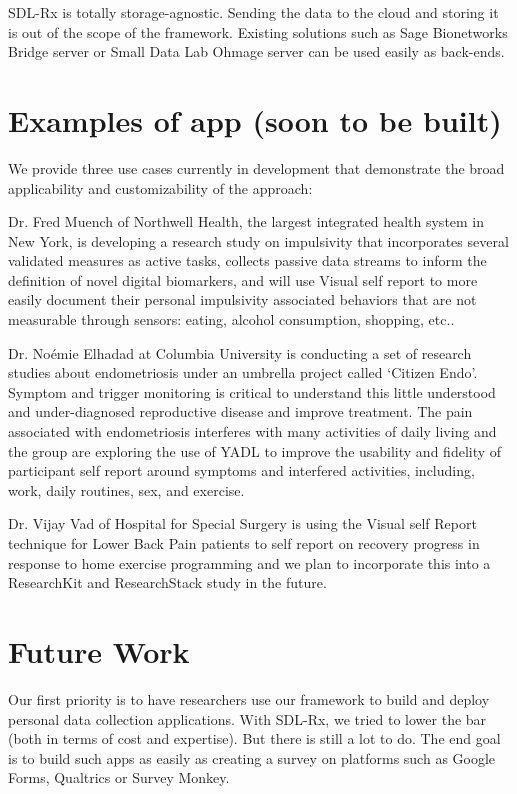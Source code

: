 \documentclass{acm_proc_article-sp}
\begin{document}
SDL-Rx is totally storage-agnostic. Sending the data to the cloud and storing it is out of the scope of the framework. Existing solutions such as Sage Bionetworks Bridge server \cite{noauthor_undated-ax} or Small Data Lab Ohmage server \cite{Software_undated-mu} can be used easily as back-ends.

\section{Examples of app (soon to be built)}
We provide three use cases currently in development that demonstrate the broad applicability and customizability of the approach:

Dr. Fred Muench of Northwell Health, the largest integrated health system in New York, is developing a research study on impulsivity that incorporates several validated measures as active tasks, collects passive data streams to inform the definition of novel digital biomarkers, and will use Visual self report to more easily document their personal impulsivity associated behaviors that are not measurable through sensors: eating, alcohol consumption, shopping, etc..

Dr. No\'{e}mie Elhadad at Columbia University is conducting a set of research studies about endometriosis under an umbrella project called `Citizen Endo'. Symptom and trigger monitoring is critical to understand this little understood and under-diagnosed reproductive disease and improve treatment. The pain associated with endometriosis interferes with many activities of daily living and the group are exploring the use of YADL to improve the usability and fidelity of participant self report around symptoms and interfered activities, including, work, daily routines, sex, and exercise.

Dr. Vijay Vad of Hospital for Special Surgery  is using the Visual self Report technique for Lower Back Pain patients to self report on recovery progress in response to home exercise programming and we plan to incorporate this into a ResearchKit and ResearchStack study in the future.



\section{Future Work}
Our first priority is to have researchers use our framework to build and deploy personal data collection applications. With SDL-Rx, we tried to lower the bar (both in terms of cost and expertise). But there is still a lot to do. The end goal is to build such apps as easily as creating a survey on platforms such as Google Forms, Qualtrics or Survey Monkey.
\end{document}
